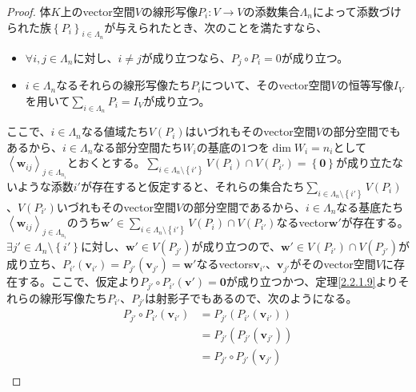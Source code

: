 \documentclass[dvipdfmx]{jsarticle}
\begin{document}
\begin{proof}
体$K$上のvector空間$V$の線形写像$P_{i}:V \rightarrow V$の添数集合$\varLambda_{n}$によって添数づけられた族$\left\{ P_{i} \right\}_{i \in \varLambda_{n}}$が与えられたとき、次のことを満たすなら、
\begin{itemize}
\item
  $\forall i,j \in \varLambda_{n}$に対し、$i \neq j$が成り立つなら、$P_{j} \circ P_{i} = 0$が成り立つ。
\item
  $i \in \varLambda_{n}$なるそれらの線形写像たち$P_{i}$について、そのvector空間$V$の恒等写像$I_{V}$を用いて$\sum_{i \in \varLambda_{n}} P_{i} = I_{V}$が成り立つ。
\end{itemize}
ここで、$i \in \varLambda_{n}$なる値域たち$V\left( P_{i} \right)$はいづれもそのvector空間$V$の部分空間でもあるから、$i \in \varLambda_{n}$なる部分空間たち$W_{i}$の基底の1つを$\dim W_{i} = n_{i}$として$\left\langle \mathbf{w}_{ij} \right\rangle_{j \in \varLambda_{n_{i}}}$とおくとする。$\sum_{i \in \varLambda_{n} \setminus \left\{ i' \right\}} {V\left( P_{i} \right)} \cap V\left( P_{i'} \right) = \left\{ \mathbf{0} \right\}$が成り立たないような添数$i'$が存在すると仮定すると、それらの集合たち$\sum_{i \in \varLambda_{n} \setminus \left\{ i' \right\}} {V\left( P_{i} \right)}$、$V\left( P_{i'} \right)$いづれもそのvector空間$V$の部分空間であるから、$i \in \varLambda_{n}$なる基底たち$\left\langle \mathbf{w}_{ij} \right\rangle_{j \in \varLambda_{n_{i}}}$のうち$\mathbf{w}' \in \sum_{i \in \varLambda_{n} \setminus \left\{ i' \right\}} {V\left( P_{i} \right)} \cap V\left( P_{i'} \right)$なるvector$\mathbf{w}'$が存在する。$\exists j' \in \varLambda_{n} \setminus \left\{ i' \right\}$に対し、$\mathbf{w}' \in V\left( P_{j'} \right)$が成り立つので、$\mathbf{w}' \in V\left( P_{i'} \right) \cap V\left( P_{j'} \right)$が成り立ち、$P_{i'}\left( \mathbf{v}_{i'} \right) = P_{j'}\left( \mathbf{v}_{j'} \right) = \mathbf{w}'$なるvectors$\mathbf{v}_{i'}$、$\mathbf{v}_{j'}$がそのvector空間$V$に存在する。ここで、仮定より$P_{j'} \circ P_{i'}\left( \mathbf{v}' \right) = \mathbf{0}$が成り立つかつ、定理\ref{2.2.1.9}よりそれらの線形写像たち$P_{i'}$、$P_{j'}$は射影子でもあるので、次のようになる。
\begin{align*}
P_{j'} \circ P_{i'}\left( \mathbf{v}_{i'} \right) &= P_{j'}\left( P_{i'}\left( \mathbf{v}_{i'} \right) \right)\\
&= P_{j'}\left( P_{j'}\left( \mathbf{v}_{j'} \right) \right)\\
&= P_{j'} \circ P_{j'}\left( \mathbf{v}_{j'} \right)\\

\end{align*}
\end{proof}
\end{document}
